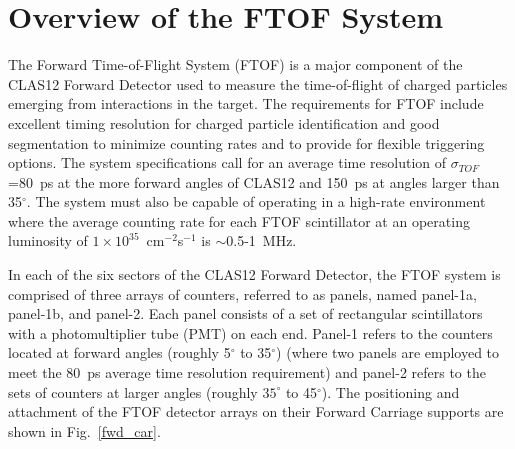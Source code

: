 \documentclass{elsart}
\begin{document}
\section{Overview of the FTOF System}
\label{sec:overview}

The Forward Time-of-Flight System (FTOF) is a major component of the CLAS12 Forward Detector
used to measure the time-of-flight of charged particles emerging from interactions in the target.
The requirements for FTOF include excellent timing resolution for charged particle identification and
good segmentation to minimize counting rates and to provide for flexible triggering options. The system
specifications call for an average time resolution of $\sigma_{TOF}$=80~ps at the more forward angles
of CLAS12 and 150~ps at angles larger than 35$^\circ$. The system must also be capable of operating in
a high-rate environment where the average counting rate for each FTOF scintillator at an operating
luminosity of $1 \times 10^{35}$~cm$^{-2}$s$^{-1}$ is $\sim$0.5-1~MHz.

In each of the six sectors of the CLAS12 Forward Detector, the FTOF system is comprised of three
arrays of counters, referred to as panels, named panel-1a, panel-1b, and panel-2. Each panel consists
of a set of rectangular scintillators with a photomultiplier tube (PMT) on each end. Panel-1 refers to
the counters located at forward angles (roughly 5$^\circ$ to 35$^\circ$) (where two panels are
employed to meet the 80~ps average time resolution requirement) and panel-2 refers to the sets of
counters at larger angles (roughly $35^\circ$ to 45$^\circ$). The positioning and attachment of the
FTOF detector arrays on their Forward Carriage supports are shown in Fig.~\ref{fwd_car}.
\end{document}
